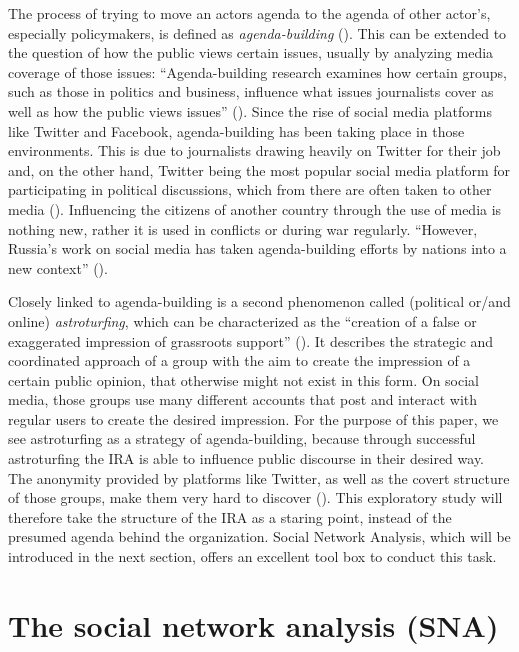 \documentclass[12pt, titlepage=true, toc=bib]{scrartcl}
\begin{document}
The process of trying to move an actors agenda to the agenda of other actor's, especially policymakers, is defined as \textit{agenda-building} (\cite[3]{linvill_troll_2018}). This can be extended to the question of how the public views certain issues, usually by analyzing media coverage of those issues: ``Agenda-building research examines how certain groups, such as those in politics and business, influence what issues journalists cover as well as how the public views issues'' (\cite[434]{parmelee_agenda-building_2014}). Since the rise of social media platforms like Twitter and Facebook, agenda-building has been taking place in those environments. This is due to journalists drawing heavily on Twitter for their job and, on the other hand, Twitter being the most popular social media platform for participating in political discussions, which from there are often taken to other media (\cite[435, 437]{parmelee_agenda-building_2014}). Influencing the citizens of another country through the use of media is nothing new, rather it is used in conflicts or during war regularly. ``However, Russia's work on social media has taken agenda-building efforts by nations into a new context'' (\cite[3]{linvill_troll_2018}).

Closely linked to agenda-building is a second phenomenon called (political or/and online) \textit{astroturfing}, which can be characterized as the ``creation of a false or exaggerated impression of grassroots support'' (\cite{harcup_astroturfing_2014}). It describes the strategic and coordinated approach of a group with the aim to create the impression of a certain public opinion, that otherwise might not exist in this form. On social media, those groups use many different accounts that post and interact with regular users to create the desired impression. For the purpose of this paper, we see astroturfing as a strategy of agenda-building, because through successful astroturfing the IRA is able to influence public discourse in their desired way. The anonymity provided by platforms like Twitter, as well as the covert structure of those groups, make them very hard to discover (\cite[564]{yang_how_2017}). This exploratory study will therefore take the structure of the IRA as a staring point, instead of the presumed agenda behind the organization. Social Network Analysis, which will be introduced in the next section, offers an excellent tool box to conduct this task.


\section{The social network analysis (SNA)}
\end{document}
